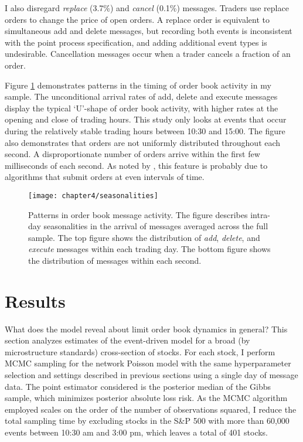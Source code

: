 	I also disregard \textit{replace} (3.7\%) and \textit{cancel} (0.1\%) messages. Traders use replace orders to change the price of open orders. A replace order is equivalent to simultaneous add and delete messages, but recording both events is inconsistent with the point process specification, and adding additional event types is undesirable. Cancellation messages occur when a trader cancels a fraction of an order.

	Figure \ref{fig:seasonalities} demonstrates patterns in the timing of order book activity in my sample. The unconditional arrival rates of add, delete and execute messages display the typical `U'-shape of order book activity, with higher rates at the opening and close of trading hours. This study only looks at events that occur during the relatively stable trading hours between 10:30 and 15:00. The figure also demonstrates that orders are not uniformly distributed throughout each second. A disproportionate number of orders arrive within the first few milliseconds of each second. As noted by \cite{Hasbrouck2013}, this feature is probably due to algorithms that submit orders at even intervals of time.

	\begin{figure}[t]
		\small
		\linespread{1}
		\centering
		\texttt{[image: chapter4/seasonalities]}
		\captionsetup{skip=-20pt, labelsep=colon, font=footnotesize, width=\linewidth, justification=justified}
		\caption[Patterns in order book message activity]{Patterns in order book message activity. The figure describes intra-day seasonalities in the arrival of messages averaged across the full sample. The top figure shows the distribution of \textit{add}, \textit{delete}, and \textit{execute} messages within each trading day. The bottom figure shows the distribution of messages within each second.}
		\label{fig:seasonalities}
	\end{figure}


\section{Results}
	What does the model reveal about limit order book dynamics in general? This section analyzes estimates of the event-driven model for a broad (by microstructure standards) cross-section of stocks. For each stock, I perform MCMC sampling for the network Poisson model with the same hyperparameter selection and settings described in previous sections using a single day of message data. The point estimator considered is the posterior median of the Gibbs sample, which minimizes posterior absolute loss risk. As the MCMC algorithm employed scales on the order of the number of observations squared, I reduce the total sampling time by excluding stocks in the S\&P 500 with more than 60,000 events between 10:30 am and 3:00 pm, which leaves a total of 401 stocks.

